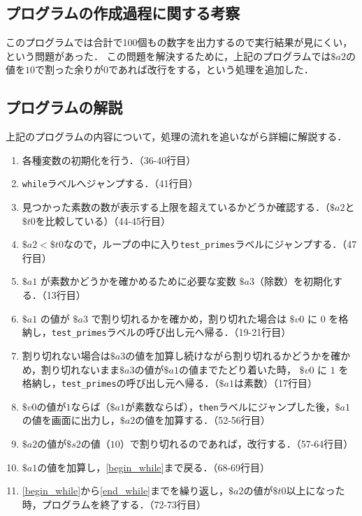 \documentclass[a4j,11pt]{jarticle}
\begin{document}
\subsection{プログラムの作成過程に関する考察}

このプログラムでは合計で100個もの数字を出力するので実行結果が見にくい，という問題があった．
この問題を解決するために，上記のプログラムでは$\$a2$の値を$10$で割った余りが$0$であれば改行をする，という処理を追加した．

\subsection{プログラムの解説}
上記のプログラムの内容について，処理の流れを追いながら詳細に解説する．

\begin{enumerate}
      \item 各種変数の初期化を行う．（36-40行目）
      \item {\tt while}ラベルへジャンプする．（41行目）
      \item \label{begin_while}見つかった素数の数が表示する上限を超えているかどうか確認する．（$\$a2$と$\$t0$を比較している）（44-45行目）
      \item $\$a2 < \$t0$なので，ループの中に入り{\tt test\_primes}ラベルにジャンプする．（47行目）
      \item $\$a1$ が素数かどうかを確かめるために必要な変数 $\$a3$（除数）を初期化する．（13行目）
      \item $\$a1$ の値が $\$a3$ で割り切れるかを確かめ，割り切れた場合は $\$v0$ に $0$ を格納し，{\tt test\_primes}ラベルの呼び出し元へ帰る．（19-21行目）
      \item 割り切れない場合は$\$a3$の値を加算し続けながら割り切れるかどうかを確かめ，割り切れないまま$\$a3$の値が$\$a1$の値までたどり着いた時，
      $\$v0$ に $1$ を格納し，{\tt test\_primes}の呼び出し元へ帰る．（$\$a1$は素数）（17行目）
      \item $\$v0$の値が$1$ならば（$\$a1$が素数ならば），{\tt then}ラベルにジャンプした後，$\$a1$の値を画面に出力し，$\$a2$の値を加算する．（52-56行目）
      \item $\$a2$の値が$\$s2$の値（$10$）で割り切れるのであれば，改行する．（57-64行目）
      \item \label{end_while}$\$a1$の値を加算し，\ref{begin_while}まで戻る．（68-69行目）
      \item \ref{begin_while}から\ref{end_while}までを繰り返し，$\$a2$の値が$\$t0$以上になった時，プログラムを終了する．（72-73行目）
\end{enumerate}
\end{document}
